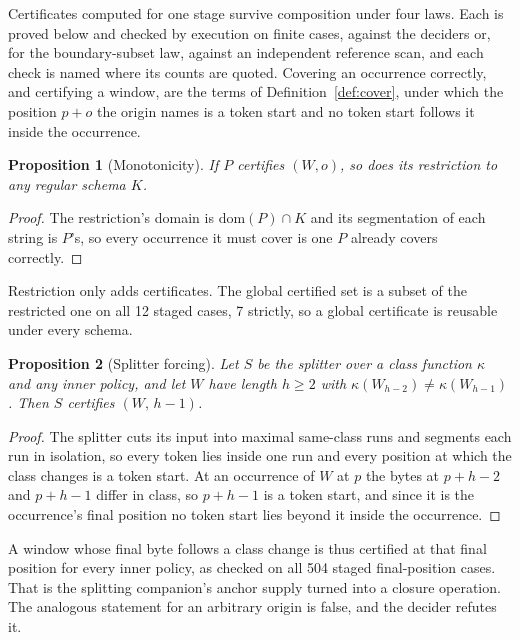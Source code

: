 \documentclass[11pt,a4paper]{article}
\theoremstyle{definition}
\theoremstyle{plain}
\newtheorem{proposition}{Proposition}
\begin{document}
Certificates computed for one stage survive composition under four laws. Each is proved below and checked by execution
on finite cases, against the deciders or, for the boundary-subset law, against an independent reference scan, and each
check is named where its counts are quoted. Covering an occurrence correctly, and certifying a window, are the terms of
Definition~\ref{def:cover}, under which the position $p+o$ the origin names is a token start and no token start follows
it inside the occurrence.

\begin{proposition}[Monotonicity]\label{prop:monotone}
If $P$ certifies $(W,o)$, so does its restriction to any regular schema $K$.
\end{proposition}

\begin{proof}
The restriction's domain is $\mathrm{dom}(P) \cap K$ and its segmentation of each string is $P$'s, so every occurrence
it must cover is one $P$ already covers correctly.
\end{proof}

Restriction only adds certificates. The global certified set is a subset of the restricted one on all 12 staged cases, 7
strictly, so a global certificate is reusable under every schema.

\begin{proposition}[Splitter forcing]\label{prop:splitter}
Let $S$ be the splitter over a class function $\kappa$ and any inner policy, and let $W$ have length $h \ge 2$ with
$\kappa(W_{h-2}) \neq \kappa(W_{h-1})$. Then $S$ certifies $(W,\,h-1)$.
\end{proposition}

\begin{proof}
The splitter cuts its input into maximal same-class runs and segments each run in isolation, so every token lies inside
one run and every position at which the class changes is a token start. At an occurrence of $W$ at $p$ the bytes at
$p+h-2$ and $p+h-1$ differ in class, so $p+h-1$ is a token start, and since it is the occurrence's final position no
token start lies beyond it inside the occurrence.
\end{proof}

A window whose final byte follows a class change is thus certified at that final position for every inner policy, as
checked on all 504 staged final-position cases. That is the splitting companion's anchor supply turned into a closure
operation. The analogous statement for an arbitrary origin is false, and the decider refutes it.
\end{document}
